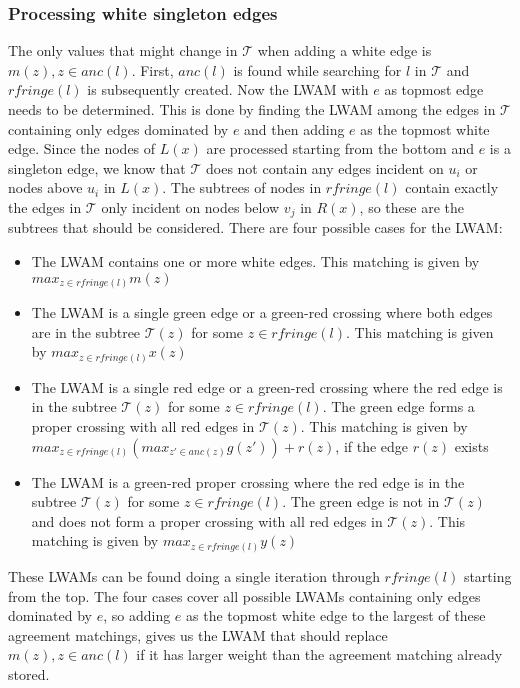\subsubsection{Processing white singleton edges}
The only values that might change in $\mathcal{T}$ when adding a white edge is $m(z), z \in anc(l)$. First, $anc(l)$ is found while searching for $l$ in $\mathcal{T}$ and $rfringe(l)$ is subsequently created. Now the LWAM with $e$ as topmost edge needs to be determined. This is done by finding the LWAM among the edges in $\mathcal{T}$ containing only edges dominated by $e$ and then adding $e$ as the topmost white edge. Since the nodes of $L(x)$ are processed starting from the bottom and $e$ is a singleton edge, we know that $\mathcal{T}$ does not contain any edges incident on $u_i$ or nodes above $u_i$ in $L(x)$. The subtrees of nodes in $rfringe(l)$ contain exactly the edges in $\mathcal{T}$ only incident on nodes below $v_j$ in $R(x)$, so these are the subtrees that should be considered. %
There are four possible cases for the LWAM:
\begin{itemize}
	\item The LWAM contains one or more white edges.
	\subitem This matching is given by $max_{z \in rfringe(l)} m(z)$
	\item The LWAM is a single green edge or a green-red crossing where both edges are in the subtree $\mathcal{T}(z)$ for some $z \in rfringe(l)$.
	\subitem This matching is given by $max_{z \in rfringe(l)} x(z)$
	\item The LWAM is a single red edge or a green-red crossing where the red edge is in the subtree $\mathcal{T}(z)$ for some $z \in rfringe(l)$. The green edge forms a proper crossing with all red edges in $\mathcal{T}(z)$.
	\subitem This matching is given by
	\subsubitem $max_{z \in rfringe(l)} (max_{z' \in anc(z)} g(z')) + r(z)$, if the edge $r(z)$ exists
	\item The LWAM is a green-red proper crossing where the red edge is in the subtree $\mathcal{T}(z)$ for some $z \in rfringe(l)$. The green edge is not in $\mathcal{T}(z)$ and does not form a proper crossing with all red edges in $\mathcal{T}(z)$.
	This matching is given by $max_{z \in rfringe(l)} y(z)$
\end{itemize}

These LWAMs can be found doing a single iteration through $rfringe(l)$ starting from the top. The four cases cover all possible LWAMs containing only edges dominated by $e$, so adding $e$ as the topmost white edge to the largest of these agreement matchings, gives us the LWAM that should replace $m(z), z \in anc(l)$ if it has larger weight than the agreement matching already stored.

